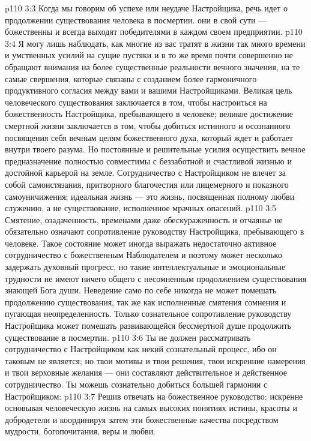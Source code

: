 \vs p110 3:3 Когда мы говорим об успехе или неудаче Настройщика, речь идет о продолжении существования человека в посмертии.  они в свой сути --- божественны и всегда выходят победителями в каждом своем предприятии.
\vs p110 3:4 \pc Я могу лишь наблюдать, как многие из вас тратят в жизни так много времени и умственных усилий на сущие пустяки и в то же время почти совершенно не обращают внимания на более существенные реальности вечного значения, на те самые свершения, которые связаны с созданием более гармоничного продуктивного согласия между вами и вашими Настройщиками. Великая цель человеческого существования заключается в том, чтобы настроиться на божественность Настройщика, пребывающего в человеке; великое достижение смертной жизни заключается в том, чтобы добиться истинного и осознанного посвящения себя вечным целям божественного духа, который ждет и работает внутри твоего разума. Но постоянные и решительные усилия осуществить вечное предназначение полностью совместимы с беззаботной и счастливой жизнью и достойной карьерой на земле. Сотрудничество с Настройщиком не влечет за собой самоистязания, притворного благочестия или лицемерного и показного самоуничижения; идеальная жизнь --- это жизнь, посвященная полному любви служению, а не существование, исполненное мрачных опасений.
\vs p110 3:5 \pc Смятение, озадаченность, временами даже обескураженность и отчаянье не обязательно означают сопротивление руководству Настройщика, пребывающего в человеке. Такое состояние может иногда выражать недостаточно активное сотрудничество с божественным Наблюдателем и поэтому может несколько задержать духовный прогресс, но такие интеллектуальные и эмоциональные трудности не имеют ничего общего с несомненным продолжением существования знающей Бога души. Неведение само по себе никогда не может помешать продолжению существования, так же как исполненные смятения сомнения и пугающая неопределенность. Только сознательное сопротивление руководству Настройщика может помешать развивающейся бессмертной душе продолжить существование в посмертии.
\vs p110 3:6 Ты не должен рассматривать сотрудничество с Настройщиком как некий сознательный процесс, ибо он таковым не является; но твои мотивы и твои решения, твои искренние намерения и твои верховные желания --- они составляют действительное и действенное сотрудничество. Ты можешь сознательно добиться большей гармонии с Настройщиком:
\vs p110 3:7 \bibnobreakspace Решив отвечать на божественное руководство; искренне основывая человеческую жизнь на самых высоких понятиях истины, красоты и добродетели и координируя затем эти божественные качества посредством мудрости, богопочитания, веры и любви.
